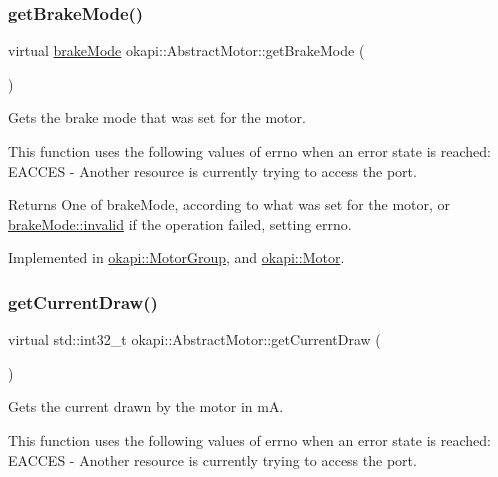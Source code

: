 \subsubsection{\texorpdfstring{getBrakeMode()}{getBrakeMode()}}
{\footnotesize\ttfamily virtual \mbox{\hyperlink{classokapi_1_1AbstractMotor_a132e0485dbb59a60c3f934338d8fa601}{brake\+Mode}} okapi\+::\+Abstract\+Motor\+::get\+Brake\+Mode (\begin{DoxyParamCaption}{ }\end{DoxyParamCaption})\hspace{0.3cm}{\ttfamily [pure virtual]}}

Gets the brake mode that was set for the motor.

This function uses the following values of errno when an error state is reached\+: E\+A\+C\+C\+ES -\/ Another resource is currently trying to access the port.

\begin{DoxyReturn}{Returns}
One of brake\+Mode, according to what was set for the motor, or \mbox{\hyperlink{classokapi_1_1AbstractMotor_a132e0485dbb59a60c3f934338d8fa601afedb2d84cafe20862cb4399751a8a7e3}{brake\+Mode\+::invalid}} if the operation failed, setting errno. 
\end{DoxyReturn}


Implemented in \mbox{\hyperlink{classokapi_1_1MotorGroup_a96fb47ca2da80930123c2b7e7176befb}{okapi\+::\+Motor\+Group}}, and \mbox{\hyperlink{classokapi_1_1Motor_aec419fead574828b4b1b2642a424dcbe}{okapi\+::\+Motor}}.

\mbox{\label{classokapi_1_1AbstractMotor_a755ad2c78a4b36cc56eef1029a3aa217}} 
\subsubsection{\texorpdfstring{getCurrentDraw()}{getCurrentDraw()}}
{\footnotesize\ttfamily virtual std\+::int32\+\_\+t okapi\+::\+Abstract\+Motor\+::get\+Current\+Draw (\begin{DoxyParamCaption}{ }\end{DoxyParamCaption})\hspace{0.3cm}{\ttfamily [pure virtual]}}

Gets the current drawn by the motor in mA.

This function uses the following values of errno when an error state is reached\+: E\+A\+C\+C\+ES -\/ Another resource is currently trying to access the port.


